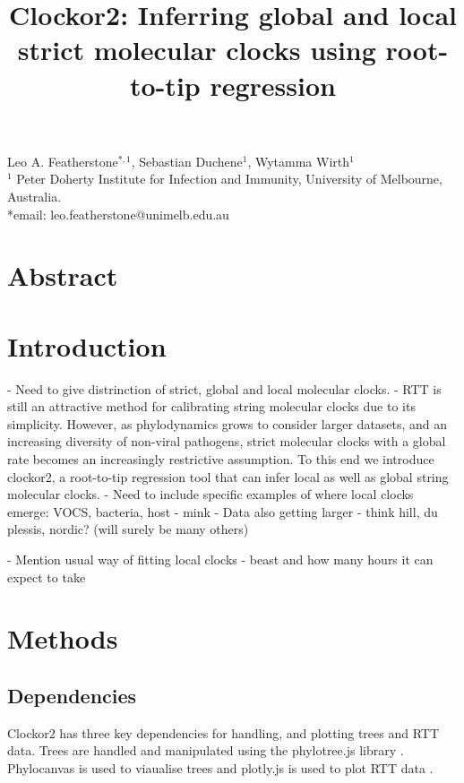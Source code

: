 \documentclass{article}
\title{Clockor2:  Inferring global and local strict molecular clocks using root-to-tip regression}
\begin{document}
\maketitle
\begin{centering}
Leo A. Featherstone$^{\ast,1}$, Sebastian Duchene$^1$, Wytamma Wirth$^{1}$\\
$^{1}$ Peter Doherty Institute for Infection and Immunity, University of Melbourne, Australia.\\
*email: leo.featherstone@unimelb.edu.au
\end{centering}

\section*{Abstract}


\section*{Introduction}
- Need to give distrinction of strict, global and local molecular clocks.
- RTT is still an attractive method for calibrating string molecular clocks due to its simplicity. However, as phylodynamics grows to consider larger datasets, and an increasing diversity of non-viral pathogens, strict molecular clocks with a global rate becomes an increasingly restrictive assumption. To this end we introduce clockor2, a root-to-tip regression tool that  can infer local as well as global string molecular clocks.
- Need to include specific examples of where local clocks emerge: VOCS, bacteria, host - mink
- Data also getting larger - think hill, du plessis, nordic? (will surely be many others)

- Mention usual way of fitting local clocks - beast and how many hours it can expect to take

\section*{Methods}
\subsection*{Dependencies}
Clockor2 has three key dependencies for handling, and plotting trees and RTT data. Trees are handled and manipulated using the phylotree.js library \citep{shank_phylotreejs_2018}. Phylocanvas is used to viaualise trees and plotly.js is used to plot RTT data \citep{abudahab_phylocanvasgl_2021}.
\end{document}
